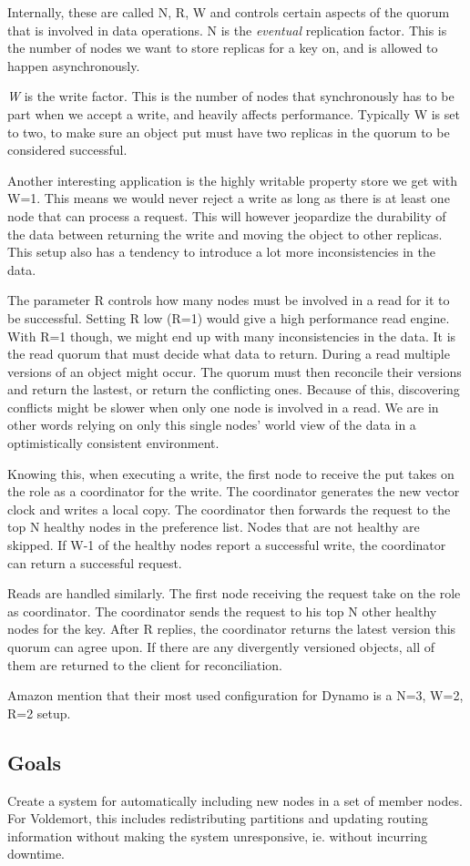 Internally, these are called N, R, W and controls certain aspects of the quorum that is involved in data operations. N is the \emph{eventual} replication factor.
This is the number of nodes we want to store replicas for a key on, and is allowed to happen asynchronously.

\emph{W} is the write factor. This is the number of nodes that synchronously has to be part when we accept a write, and heavily affects performance. 
Typically W is set to two, to make sure an object put must have two replicas in the quorum to be considered successful. 

Another interesting application is the highly writable property store we get with W=1. This means we would never reject a write as long as there is at least one node that can process a request. This will however jeopardize the durability of the data between returning the write and moving the object to other replicas. This setup also has a tendency to introduce a lot more inconsistencies in the data\cite{dynamo}.

The parameter R controls how many nodes must be involved in a read for it to be successful. Setting R low (R=1) would give a high performance read engine. With R=1 though, we might end up with many inconsistencies in the data. It is the read quorum that must decide what data to return. During a read multiple versions of an object might occur. The quorum must then reconcile their versions and return the lastest, or return the conflicting ones.
Because of this, discovering conflicts might be slower when only one node is involved in a read. We are in other words relying on only this single nodes' world view of the data in a optimistically consistent environment.

Knowing this, when executing a write, the first node to receive the put takes on the role as a coordinator for the write. The coordinator generates the new vector clock and writes a local copy. The coordinator then forwards the request to the top N healthy nodes in the preference list. Nodes that are not healthy are skipped. If W-1 of the healthy nodes report a successful write, the coordinator can return a successful request. 

Reads are handled similarly. The first node receiving the request take on the role as coordinator. The coordinator sends the request to his top N other healthy nodes for the key. After R replies, the coordinator returns the latest version this quorum can agree upon. If there are any divergently versioned objects, all of them are returned to the client for reconciliation.

Amazon\cite{dynamo} mention that their most used configuration for Dynamo is a N=3, W=2, R=2 setup.


\subsection{Goals}
Create a system for automatically including new nodes in a set of member nodes.
For Voldemort, this includes redistributing partitions and updating routing information without making the system unresponsive, ie. without incurring downtime.


